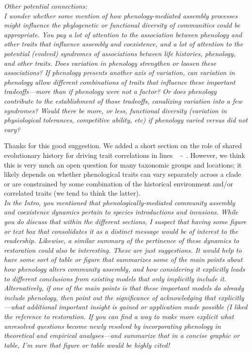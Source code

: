 \documentclass[11pt]{article}
\newcommand{\lr}[1]{~\lineref{#1}}
\begin{document}
\emph{Other potential connections:\\
I wonder whether some mention of how phenology-mediated assembly processes might influence the phylogenetic or functional diversity of communities could be appropriate. You pay a lot of attention to the association between phenology and other traits that influence assembly and coexistence, and a lot of attention to the potential (evolved) syndromes of associations between life histories, phenology, and other traits. Does variation in phenology strengthen or loosen these associations? If phenology presents another axis of variation, can variation in phenology allow different combinations of traits that influence these important tradeoffs—more than if phenology were not a factor? Or does phenology contribute to the establishment of those tradeoffs, canalizing variation into a few syndromes? Would there be more, or less, functional diversity (variation in physiological tolerances, competitive ability, etc) if phenology varied versus did not vary?}

Thanks for this good suggestion. We added a short section on the role of shared evolutionary history for driving trait correlations in lines \lr{phylo1} -\lr{phylo2}. However, we think this is very much an open question for many taxonomic groups and locations; it likely depends on whether phenological traits can vary separately across a clade or are constrained by some combination of the historical environment and/or correlated traits (we tend to think the latter).\\

\emph{In the Intro, you mentioned that phenologically-mediated community assembly and coexistence dynamics pertain to species introductions and invasions. While you do discuss that within the different sections, I suspect that having some figure or text box that consolidates it as a distinct message would be of interest to the readership. Likewise, a similar summary of the pertinence of these dynamics to restoration could also be interesting. These are just suggestions. It would help to have some sort of table or figure that summarizes some of the main points about how phenology alters community assembly, and how considering it explicitly leads to different conclusions from existing models that only implicitly include it. Alternatively, if one of the main points is that these important models do already include phenology, then point out the significance of acknowledging that explicitly—what additional important insight is gained or application made possible (I liked the reference to restoration. If you can find a way to make more explicit what unresolved questions become newly resolved by incorporating phenology in theoretical and empirical analyses—and summarize that in a concise graphic or table, I’m sure that figure or table would be highly cited!}\\
\end{document}

